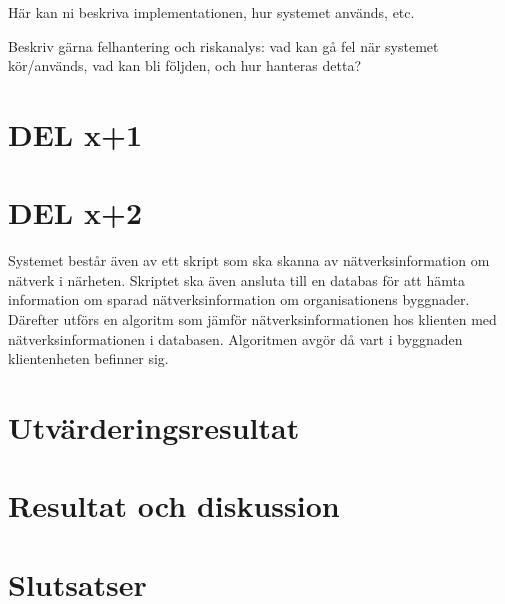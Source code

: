 \documentclass[swedish, a4paper,12pt]{article}
\begin{document}
Här kan ni beskriva implementationen, hur systemet används, etc.

Beskriv gärna felhantering och riskanalys: vad kan gå fel när systemet kör/används, vad kan bli följden, och hur hanteras detta?
\fi
\section{DEL x+1}
\section{DEL x+2}

\fi
Systemet består även av ett skript som ska skanna av nätverksinformation om nätverk i närheten. Skriptet ska även ansluta till en databas för att hämta information om sparad nätverksinformation om organisationens byggnader. Därefter utförs en algoritm som jämför nätverksinformationen hos klienten med nätverksinformationen i databasen. Algoritmen avgör då vart i byggnaden klientenheten befinner sig.

\section{Utvärderingsresultat}

\section{Resultat och diskussion}

\section{Slutsatser}

\end{document}
